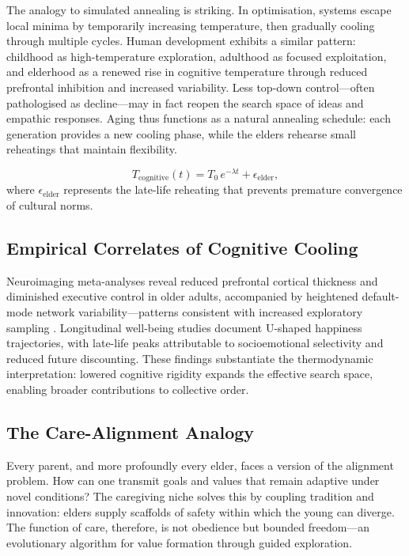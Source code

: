 \documentclass[12pt,a4paper]{article}
\begin{document}
The analogy to simulated annealing is striking.
In optimisation, systems escape local minima by temporarily increasing temperature,
then gradually cooling through multiple cycles.
Human development exhibits a similar pattern:
childhood as high-temperature exploration,
adulthood as focused exploitation,
and elderhood as a renewed rise in cognitive temperature
through reduced prefrontal inhibition and increased variability.
Less top-down control---often pathologised as decline---may in fact reopen
the search space of ideas and empathic responses.
Aging thus functions as a natural annealing schedule:
each generation provides a new cooling phase,
while the elders rehearse small reheatings that maintain flexibility.

\[
T_{\text{cognitive}}(t) =
T_0\, e^{-\lambda t} + \epsilon_{\text{elder}},
\]
where \(\epsilon_{\text{elder}}\) represents the late-life reheating that prevents
premature convergence of cultural norms.

\subsection{Empirical Correlates of Cognitive Cooling}

Neuroimaging meta-analyses reveal reduced prefrontal cortical thickness 
and diminished executive control in older adults, 
accompanied by heightened default-mode network variability---patterns 
consistent with increased exploratory sampling \citep{carstensen2011emotional}. 
Longitudinal well-being studies document U-shaped happiness trajectories, 
with late-life peaks attributable to socioemotional selectivity 
and reduced future discounting. These findings substantiate the thermodynamic 
interpretation: lowered cognitive rigidity expands the effective 
search space, enabling broader contributions to collective order.

\subsection{The Care-Alignment Analogy}

Every parent, and more profoundly every elder,
faces a version of the alignment problem.
How can one transmit goals and values that remain adaptive under novel conditions?
The caregiving niche solves this by coupling tradition and innovation:
elders supply scaffolds of safety within which the young can diverge.
The function of care, therefore, is not obedience but bounded freedom---an
evolutionary algorithm for value formation through guided exploration.
\end{document}
